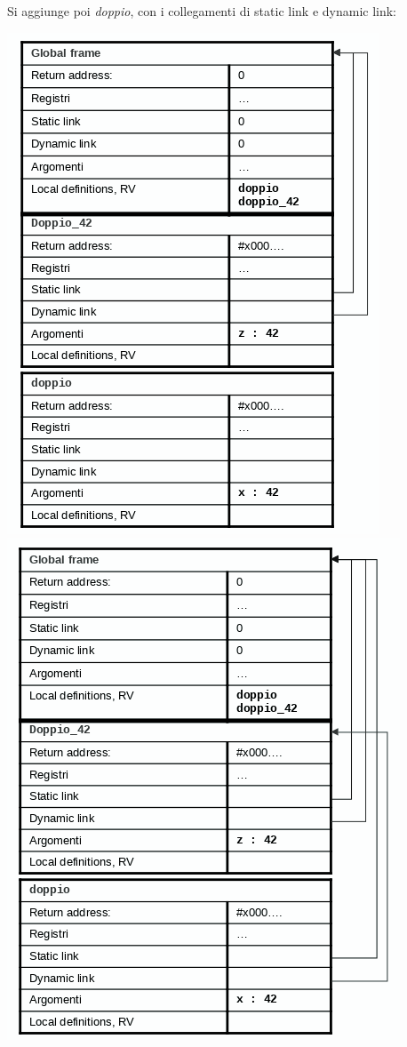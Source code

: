 \documentclass[a4paper,12pt, oneside]{book}
\begin{document}
\newpage
Si aggiunge poi \textit{doppio}, con i collegamenti di static link e dynamic link:
\begin{center}
	\includegraphics[scale=0.4]{img/sta4.png}
	\quad
	\includegraphics[scale=0.4]{img/sta5.png}
\end{center}
\end{document}
